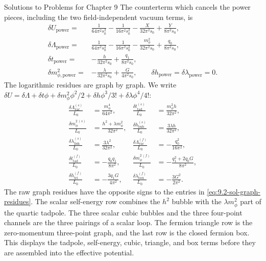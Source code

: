 \begin{bankssolutions}{Solutions to Problems for Chapter 9}
The counterterm which cancels the power pieces, including the two
field-independent vacuum terms, is
\begin{align}
 \delta U_{\mathrm{power}}={}&\frac{1}{64\pi^2s_0^2}
 -\frac{1}{16\pi^2s_0^2}-\frac{X}{32\pi^2s_0}
 +\frac{Y}{8\pi^2s_0},\nonumber\\
 \delta\Lambda_{\mathrm{power}}={}&\frac{1}{64\pi^2s_0^2}
 -\frac{1}{16\pi^2s_0^2}-\frac{m_\phi^2}{32\pi^2s_0}
 +\frac{q_0}{8\pi^2s_0},\nonumber\\
 \delta t_{\mathrm{power}}={}&-\frac{h}{32\pi^2s_0}
 +\frac{q_1}{8\pi^2s_0},\nonumber\\
 \delta m_{\phi,\mathrm{power}}^2={}&-\frac{\lambda}{32\pi^2s_0}
 +\frac{G}{4\pi^2s_0},\qquad
 \delta h_{\mathrm{power}}=\delta\lambda_{\mathrm{power}}=0.
 \label{eq:9.2-sol-power-counterterms}
\end{align}
The logarithmic residues are graph by graph.  We write
$\delta U=\delta\Lambda+\delta t\phi+\delta m_\phi^2\phi^2/2
+\delta h\phi^3/3!+\delta\lambda\phi^4/4!$:
\begin{align}
 \frac{\delta\Lambda^{(s)}_{\mathrm{vac}}}{L_0}&=\frac{m_\phi^4}{64\pi^2},
 &\frac{\delta t^{(s)}_{\mathrm{tad}}}{L_0}&=\frac{m_\phi^2h}{32\pi^2},\nonumber\\
 \frac{\delta m_\phi^{2\,(s)}}{L_0}&=\frac{h^2+\lambda m_\phi^2}{32\pi^2},
 &\frac{\delta h^{(s)}_{\mathrm{bub}}}{L_0}&=\frac{3\lambda h}{32\pi^2},\nonumber\\
 \frac{\delta\lambda^{(s)}_{\mathrm{fish}}}{L_0}&=\frac{3\lambda^2}{32\pi^2},
 &\frac{\delta\Lambda^{(f)}_{\mathrm{vac}}}{L_0}&=-\frac{q_0^2}{16\pi^2},\nonumber\\
 \frac{\delta t^{(f)}_{\mathrm{tad}}}{L_0}&=-\frac{q_0q_1}{8\pi^2},
 &\frac{\delta m_\phi^{2\,(f)}}{L_0}&=-\frac{q_1^2+2q_0G}{8\pi^2},\nonumber\\
 \frac{\delta h^{(f)}_{\mathrm{tri}}}{L_0}&=-\frac{3q_1G}{4\pi^2},
 &\frac{\delta\lambda^{(f)}_{\mathrm{box}}}{L_0}&=-\frac{3G^2}{2\pi^2}.
 \label{eq:9.2-sol-graph-residues}
\end{align}
The raw graph residues have the opposite signs to the entries in
\eqref{eq:9.2-sol-graph-residues}.  The scalar self-energy row combines the
$h^2$ bubble with the $\lambda m_\phi^2$ part of the quartic tadpole.  The
three scalar cubic bubbles and the three four-point channels are the three
pairings of a scalar loop.  The fermion triangle row is the zero-momentum
three-point graph, and the last row is the closed fermion box.  This displays
the tadpole, self-energy, cubic, triangle, and box terms before they are
assembled into the effective potential.


\end{bankssolutions}
